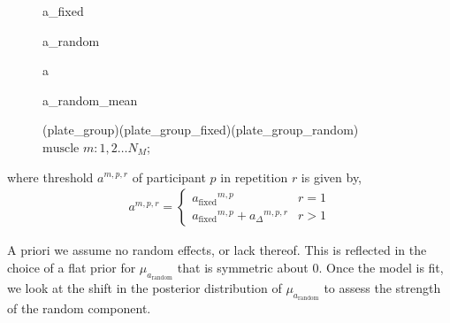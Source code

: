 \documentclass[a4paper,12pt]{article}
\begin{document}
\begin{figure}[H]
{            %
             {a_fixed}

             {a_random}

             {a}

             {a_random_mean}

             {(plate_group)(plate_group_fixed)(plate_group_random)} {$\text{muscle }m : 1, 2 \ldots N_M$};

        }
    \end{figure}

    where threshold $a^{m, p, r}$ of participant $p$ in repetition $r$ is given by,
    \begin{align*}
        a^{m, p, r} = \begin{cases}
            {{a}_\text{fixed}}^{m, p} & r = 1 \\
            {{a}_\text{fixed}}^{m, p} + {{a}_\Delta}^{m, p, r} & r > 1
        \end{cases}\tag{4.2.4}
    \end{align*}

    A priori we assume no random effects, or lack thereof. This is reflected in the choice of a flat prior for ${\mu}_{a_{\text{random}}}$ that is symmetric about $0$. Once the model is fit, we look at the shift in the posterior distribution of ${\mu}_{a_{\text{random}}}$ to assess the strength of the random component.
\end{document}
